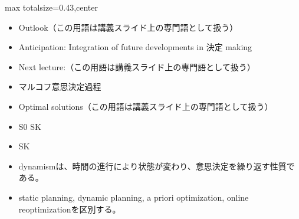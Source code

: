 \clearpage
{}
\begin{minipage}[t]{0.405\textwidth}
\begin{adjustbox}{max totalsize={\textwidth}{0.43\textheight},center}
\begin{minipage}{\textwidth}\scriptsize
{}\begin{itemize}
\item Outlook（この用語は講義スライド上の専門語として扱う）
\item Anticipation: Integration of future developments in 決定 making
\item Next lecture:（この用語は講義スライド上の専門語として扱う）
\item マルコフ意思決定過程
\item Optimal solutions（この用語は講義スライド上の専門語として扱う）
\item S0 SK
\item SK
\end{itemize}\begin{itemize}
\item dynamismは、時間の進行により状態が変わり、意思決定を繰り返す性質である。
\item static planning, dynamic planning, a priori optimization, online reoptimizationを区別する。
\end{itemize}
\end{minipage}
\end{adjustbox}
\end{minipage}\hfill
